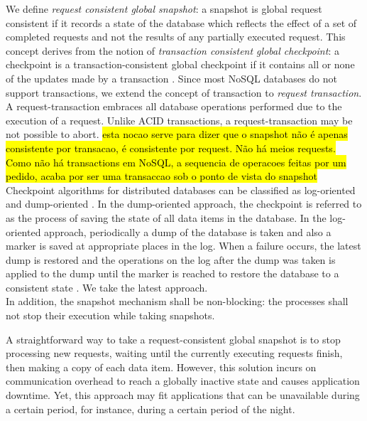 We define \textit{request consistent global snapshot}: a snapshot is global request consistent if it records a state of the database which reflects the effect of a set of completed requests and not the results of any partially executed request. This concept derives from the notion of \emph{transaction consistent global checkpoint}: a checkpoint is a transaction-consistent global checkpoint if it contains all or none of the updates made by a transaction \cite{global-checkpoint}. Since most \acs{NoSQL} databases do not support transactions, we extend the concept of transaction to \textit{request transaction}. A request-transaction embraces all database operations performed due to the execution of a request. Unlike \ac{ACID} transactions, a request-transaction may be not possible to abort. \hl{esta nocao serve para dizer que o snapshot não é apenas consistente por transacao, é consistente por request. Não há meios requests. Como não há transactions em NoSQL, a sequencia de operacoes feitas por um pedido, acaba por ser uma transaccao sob o ponto de vista do snapshot}\\ 



Checkpoint algorithms for distributed databases can be classified as log-oriented and dump-oriented \cite{checkpoint-survey}. In the dump-oriented approach, the checkpoint is referred to as the process of saving the state of all data items in the database. In the log-oriented approach, periodically a dump of the database is taken and also a marker is saved at appropriate places in the log. When a failure occurs, the latest dump is restored and the operations on the log after the dump was taken is applied to the dump until the marker is reached to restore the database to a consistent state \cite{global-checkpoint}. We take the latest approach.\\


In addition, the snapshot mechanism shall be non-blocking: the processes shall not stop their execution while taking snapshots.  

A straightforward way to take a request-consistent global snapshot is to stop processing new requests, waiting until the currently executing requests finish, then making a copy of each data item. However, this solution incurs on communication overhead to reach a globally inactive state and causes application downtime. Yet, this approach may fit applications that can be unavailable during a certain period, for instance, during a certain period of the night. \\


